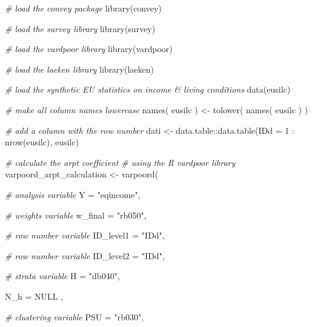 \documentclass[
]{book}
\newenvironment{Shaded}{\begin{snugshade}}{\end{snugshade}}
\newcommand{\AttributeTok}[1]{\textcolor[rgb]{0.77,0.63,0.00}{#1}}
\newcommand{\CommentTok}[1]{\textcolor[rgb]{0.56,0.35,0.01}{\textit{#1}}}
\newcommand{\ConstantTok}[1]{\textcolor[rgb]{0.00,0.00,0.00}{#1}}
\newcommand{\DecValTok}[1]{\textcolor[rgb]{0.00,0.00,0.81}{#1}}
\newcommand{\FunctionTok}[1]{\textcolor[rgb]{0.00,0.00,0.00}{#1}}
\newcommand{\NormalTok}[1]{#1}
\newcommand{\OtherTok}[1]{\textcolor[rgb]{0.56,0.35,0.01}{#1}}
\newcommand{\SpecialCharTok}[1]{\textcolor[rgb]{0.00,0.00,0.00}{#1}}
\newcommand{\StringTok}[1]{\textcolor[rgb]{0.31,0.60,0.02}{#1}}
\begin{document}
\begin{Shaded}
\begin{Highlighting}[]
\CommentTok{\# load the convey package}
\FunctionTok{library}\NormalTok{(convey)}

\CommentTok{\# load the survey library}
\FunctionTok{library}\NormalTok{(survey)}

\CommentTok{\# load the vardpoor library}
\FunctionTok{library}\NormalTok{(vardpoor)}

\CommentTok{\# load the laeken library}
\FunctionTok{library}\NormalTok{(laeken)}

\CommentTok{\# load the synthetic EU statistics on income \& living conditions}
\FunctionTok{data}\NormalTok{(eusilc)}

\CommentTok{\# make all column names lowercase}
\FunctionTok{names}\NormalTok{( eusilc ) }\OtherTok{\textless{}{-}} \FunctionTok{tolower}\NormalTok{( }\FunctionTok{names}\NormalTok{( eusilc ) )}

\CommentTok{\# add a column with the row number}
\NormalTok{dati }\OtherTok{\textless{}{-}}\NormalTok{ data.table}\SpecialCharTok{::}\FunctionTok{data.table}\NormalTok{(}\AttributeTok{IDd =} \DecValTok{1} \SpecialCharTok{:} \FunctionTok{nrow}\NormalTok{(eusilc), eusilc)}

\CommentTok{\# calculate the arpt coefficient}
\CommentTok{\# using the R vardpoor library}
\NormalTok{varpoord\_arpt\_calculation }\OtherTok{\textless{}{-}}
    \FunctionTok{varpoord}\NormalTok{(}
    
        \CommentTok{\# analysis variable}
        \AttributeTok{Y =} \StringTok{"eqincome"}\NormalTok{, }
        
        \CommentTok{\# weights variable}
        \AttributeTok{w\_final =} \StringTok{"rb050"}\NormalTok{,}
        
        \CommentTok{\# row number variable}
        \AttributeTok{ID\_level1 =} \StringTok{"IDd"}\NormalTok{,}
        
        \CommentTok{\# row number variable}
        \AttributeTok{ID\_level2 =} \StringTok{"IDd"}\NormalTok{,}
        
        \CommentTok{\# strata variable}
        \AttributeTok{H =} \StringTok{"db040"}\NormalTok{, }
        
        \AttributeTok{N\_h =} \ConstantTok{NULL}\NormalTok{ ,}
        
        \CommentTok{\# clustering variable}
        \AttributeTok{PSU =} \StringTok{"rb030"}\NormalTok{, }
        

\end{Highlighting}
\end{Shaded}
\end{document}
